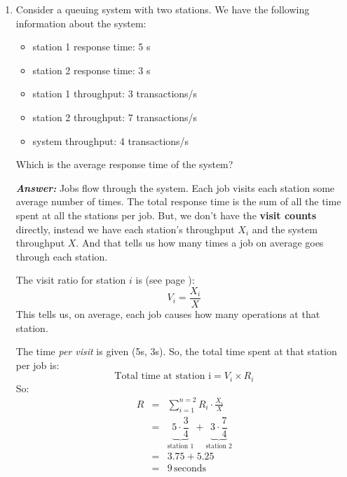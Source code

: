 \begin{enumerate}
    \newpage

    \item Consider a queuing system with two stations. We have the following information about the system:
    \begin{itemize}
        \item station 1 response time: 5 s
        \item station 2 response time: 3 s
        \item station 1 throughput: 3 transactions/s
        \item station 2 throughput: 7 transactions/s
        \item system throughput: 4 transactions/s
    \end{itemize}
    Which is the average response time of the system?
    
    \textcolor{Green3}{\textbf{\emph{Answer:}}} Jobs flow through the system. Each job visits each station some average number of times. The total response time is the sum of all the time spent at all the stations per job. But, we don't have the \textbf{visit counts} directly, instead we have each station's throughput $X_{i}$ and the system throughput $X$. And that tells us how many times a job on average goes through each station.

    \highspace
    The visit ratio for station $i$ is (see page \pageref{eq: Visit Count}):
    \begin{equation*}
        V_{i} = \dfrac{X_{i}}{X}
    \end{equation*}
    This tells us, on average, each job causes how many operations at that station.

    \highspace
    The time \emph{per visit} is given (5s, 3s). So, the total time spent at that station per job is:
    \begin{equation*}
        \text{Total time at station i} = V_i \times R_i
    \end{equation*}
    So:
    \begin{equation*}
        \begin{array}{rcl}
            R &=& \displaystyle \sum_{i=1}^{n = 2} R_i \cdot \frac{X_i}{X} \\ [1.5em]
            &=& \underbrace{5 \cdot \dfrac{3}{4}}_{\text{station 1}} + \underbrace{3 \cdot \dfrac{7}{4}}_{\text{station 2}} \\ [2.5em]
            &=& 3.75 + 5.25 \\ [.5em]
            &=& 9 \, \text{seconds}
        \end{array}
    \end{equation*}


\end{enumerate}
